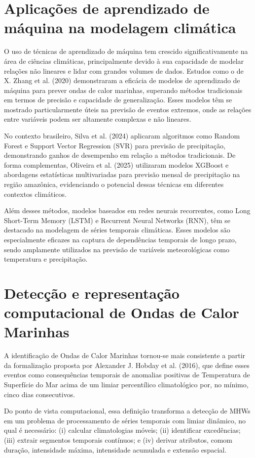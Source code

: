 \section{Aplicações de aprendizado de máquina na modelagem climática}\label{sec:aplicacoes-ml}

	O uso de técnicas de aprendizado de máquina tem crescido significativamente na área de ciências climáticas, principalmente devido à sua capacidade de modelar relações não lineares e lidar com grandes volumes de dados. Estudos como o de X. Zhang et al. (2020) demonstraram a eficácia de modelos de aprendizado de máquina para prever ondas de calor marinhas, superando métodos tradicionais em termos de precisão e capacidade de generalização. Esses modelos têm se mostrado particularmente úteis na previsão de eventos extremos, onde as relações entre variáveis podem ser altamente complexas e não lineares.

	No contexto brasileiro, Silva et al. (2024) aplicaram algoritmos como Random Forest e Support Vector Regression (SVR) para previsão de precipitação, demonstrando ganhos de desempenho em relação a métodos tradicionais. De forma complementas, Oliveira et al. (2025) utilizaram modelos XGBoost e abordagens estatísticas multivariadas para previsão mensal de precipitação na região amazônica, evidenciando o potencial dessas técnicas em diferentes contextos climáticos.

	Além desses métodos, modelos baseados em redes neurais recorrentes, como Long Short-Term Memory (LSTM) e Recurrent Neural Networks (RNN), têm se destacado na modelagem de séries temporais climáticas. Esses modelos são especialmente eficazes na captura de dependências temporais de longo prazo, sendo amplamente utilizados na previsão de variáveis meteorológicas como temperatura e precipitação.


\section{Detecção e representação computacional de Ondas de Calor Marinhas}\label{sec:deteccao-mhw}

	A identificação de Ondas de Calor Marinhas tornou-se mais consistente a partir da formalização proposta por Alexander J. Hobday et al. (2016), que define esses eventos como consequências temporais de anomalias positivas de Temperatura de Superfície do Mar acima de um limiar percentílico climatológico por, no mínimo, cinco dias consecutivos.

	Do ponto de vista computacional, essa definição transforma a detecção de MHWs em um problema de processamento de séries temporais com limiar dinâmico, no qual é necessário: (i) calcular climatologias móveis; (ii) identificar excedências; (iii) extrair segmentos temporais contínuos; e (iv) derivar atributos, comom duração, intensidade máxima, intensidade acumulada e extensão espacial.

